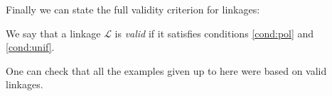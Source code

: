 Finally we can state the full validity criterion for linkages:

\begin{definition}
  We say that a linkage $\mathcal{L}$ is \emph{valid} if it satisfies conditions
  \ref{cond:pol} and \ref{cond:unif}.
\end{definition}

One can check that all the examples given up to here were based on valid
linkages.






